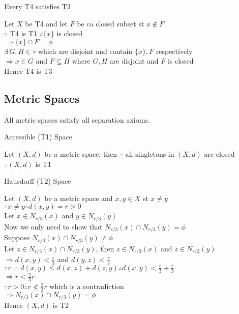 \documentclass{article}
\begin{document}
Every T4 satisfies T3
\begin{tcolorbox}[colback=lightgray!10,colframe=lightgray!10, fontupper=\linespread{1.5}\selectfont]
	Let $X$ be T4 and let $F$ be ca closed subset st $x \not\in F$ \\
	$\because$ T4 is T1 $\therefore \{x\}$ is closed \\
	$\Rightarrow \{x\} \cap F = \phi$ \\
	$\exists \, G,H \in \tau$ which are disjoint and contain $\{x\}, F$ respectively \\
	$\Rightarrow x \in G$ and $F \subseteq H$ where $G,H$ are disjoint and $F$ is closed \\
	Hence T4 is T3
\end{tcolorbox}

\subsection{Metric Spaces}

All metric spaces satisfy all separation axioms.

Accessible (T1) Space
\begin{tcolorbox}[colback=lightgray!10,colframe=lightgray!10, fontupper=\linespread{1.5}\selectfont]
	Let $(X,d)$ be a metric space, then $\because$ all singletons in $(X,d)$ are closed $\therefore (X,d)$ is T1
\end{tcolorbox}

Hausdorff (T2) Space
\begin{tcolorbox}[colback=lightgray!10,colframe=lightgray!10, fontupper=\linespread{1.5}\selectfont]
	Let $(X,d)$ be a metric space and $x,y \in X$ st $x \not= y$ \\
	$\because x \not= y \therefore d(x,y) = r > 0$ \\
	Let $x \in N_{r/3}(x)$ and $y \in N_{r/3}(y)$ \\
	Now we only need to show that $N_{r/3}(x) \cap N_{r/3}(y) =\phi$ \\
	Suppose $N_{r/3}(x) \cap N_{r/3}(y) \not= \phi$ \\
	Let $z \in N_{r/3}(x) \cap N_{r/3}(y)$, then $z \in N_{r/3}(x)$ and $z \in N_{r/3}(y)$ \\
	$\Rightarrow d(x,y) < \frac{r}{3}$ and $d(y,z) < \frac{r}{3}$ \\
	$\because r = d(x,y) \leq d(x,z) + d(z,y) \therefore d(x,y) < \frac{r}{3} + \frac{r}{3}$ \\
	$\Rightarrow r < \frac{2}{3}r$ \\
	$\because r > 0 \therefore r \not< \frac{2}{3}r$ which is a contradiction \\
	$\Rightarrow N_{r/3}(x) \cap N_{r/3}(y) =\phi$ \\
	Hence $(X,d)$ is T2
\end{tcolorbox}
\end{document}
